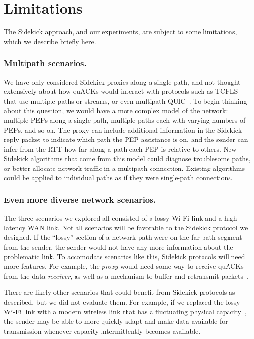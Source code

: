 \section{Limitations}

The Sidekick approach, and our experiments, are subject to some limitations,
which we describe briefly here.

\subsubsection{Multipath scenarios.}
We have only considered Sidekick proxies along a single path, and not thought
extensively about how quACKs would interact with protocols such as
\mbox{TCPLS}~\cite{rochet2020tcpls} that use multiple paths or streams,
or even multipath QUIC~\cite{de2017multipath}.
To begin thinking about this question, we would have a more complex model of
the network: multiple PEPs along a single path, multiple paths each with varying
numbers of PEPs, and so on. The proxy can include
additional information in the Sidekick-reply packet to indicate which path the
PEP assistance is on, and the sender can infer from the RTT how far along a path each PEP
is relative to others. New Sidekick algorithms that come from this model could
diagnose troublesome paths, or better allocate network traffic in a multipath
connection. Existing algorithms could be applied to individual paths as if they
were single-path connections.

\subsubsection{Even more diverse network scenarios.}
The three scenarios we explored all consisted of a lossy Wi-Fi link and a
high-latency WAN link. Not all scenarios will be favorable to the
Sidekick protocol we designed.
If the ``lossy'' section of a network path were on the far path segment from the
sender, the sender would not have any more information about the problematic
link. To accomodate scenarios like this, Sidekick protocols will need
more features. For example, the \emph{proxy} would need some way to receive
quACKs from the data \emph{receiver}, as well as a mechanism to buffer and
retransmit packets~\cite{balakrishnan1995snoop,caini2006pepsal}.

There are likely other scenarios that could benefit from Sidekick protocols as
described, but we did not evaluate them. For example, if we replaced the lossy Wi-Fi
link with a modern wireless link that has a fluctuating physical
capacity~\cite{niu2015survey,burchardt2014vlc,koenig2013wireless},
the sender may be able to more quickly adapt and make
data available for transmission whenever capacity intermittently becomes available.

